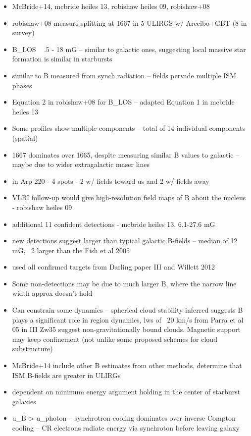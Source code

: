 \begin{itemize}
\item McBride+14, mcbride heiles 13, robishaw heiles 09, robishaw+08
\item robishaw+08 measure splitting at 1667 in 5 ULIRGS w/ Arecibo+GBT (8 in survey)
\item B_LOS ~ .5 - 18 mG -- similar to galactic ones, suggesting local massive star formation is similar in starbursts
\item similar to B measured from synch radiation -- fields pervade multiple ISM phases
\item Equation 2 in robishaw+08 for B_LOS -- adapted Equation 1 in mcbride heiles 13
\item Some profiles show multiple components -- total of 14 individual components (spatial)
\item 1667 dominates over 1665, despite measuring similar B values to galactic -- maybe due to wider extragalactic maser lines
\item in Arp 220 - 4 spots - 2 w/ fields toward us and 2 w/ fields away
\item VLBI follow-up would give high-resolution field maps of B about the nucleus - robishaw heiles 09
\item additional 11 confident detections - mcbride heiles 13, 6.1-27.6 mG
\item new detections suggest larger than typical galactic B-fields -- median of 12 mG, ~2 larger than the Fish et al 2005
\item used all confirmed targets from Darling paper III and Willett 2012
\item Some non-detections may be due to much larger B, where the narrow line width approx doesn't hold
\item Can constrain some dynamics -- spherical cloud stability inferred suggests B plays a significant role in region dynamics, lws of ~20 km/s from Parra et al 05 in III Zw35 suggest non-gravitationally bound clouds. Magnetic support may keep confinement (not unlike some proposed schemes for cloud substructure)
\item McBride+14 include other B estimates from other methods, determine that ISM B-fields are greater in ULIRGs
\item dependent on minimum energy argument holding in the center of starburst galaxies
\item u_B > u_photon -- synchrotron cooling dominates over inverse Compton cooling -- CR electrons radiate energy via synchroton before leaving galaxy
\end{itemize}
